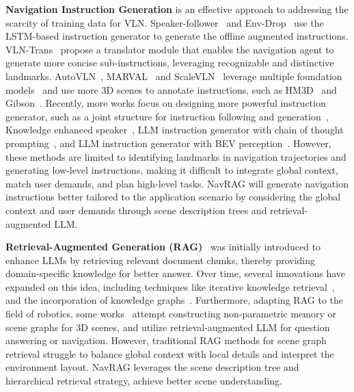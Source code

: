 \noindent \textbf{Navigation Instruction Generation} is an effective approach to addressing the scarcity of training data for VLN. Speaker-follower~\cite{fried2018speaker} and Env-Drop~\cite{tan2019learning} use the LSTM-based instruction generator to generate the offline augmented instructions. VLN-Trans~\cite{zhang2023vln} propose a translator module that enables the navigation agent to generate more concise sub-instructions, leveraging recognizable and distinctive landmarks. 
AutoVLN~\cite{chen2022learning}, MARVAL~\cite{kamath2023new} and ScaleVLN~\cite{wang2023scaling} leverage multiple foundation models~\cite{cheng2022masked,radford2019language,zhaolarge,koh2023simple} and use more 3D scenes to annotate instructions, such as HM3D~\cite{ramakrishnan2habitat} and Gibson~\cite{xia2018gibson}. Recently, more works focus on designing more powerful instruction generator, such as a joint structure for instruction following and generation~\cite{wang2023lana}, Knowledge enhanced speaker~\cite{zeng2023kefa}, LLM instruction generator with chain of thought prompting~\cite{kong2025controllable}, and LLM instruction generator with BEV perception~\cite{fan2025navigation}. However, these methods are limited to identifying landmarks in navigation trajectories and generating low-level instructions, making it difficult to integrate global context, match user demands, and plan high-level tasks. NavRAG will generate navigation instructions better tailored to the application scenario by considering the global context and user demands through scene description trees and retrieval-augmented LLM.

\noindent \textbf{Retrieval-Augmented Generation (RAG)}~\cite{lewis2020retrieval}  was initially introduced to enhance LLMs by retrieving relevant document chunks, thereby providing domain-specific knowledge for better answer. Over time, several innovations have expanded on this idea, including techniques like iterative knowledge retrieval~\cite{shao2023enhancing}, and the incorporation of knowledge graphs~\cite{edge2024local}. Furthermore, adapting RAG to the field of robotics, some works~\cite{xie2024embodied,booker2024embodiedrag} attempt constructing non-parametric memory or scene graphs for 3D scenes, and utilize retrieval-augmented LLM for question answering or navigation. However, traditional RAG methods for scene graph retrieval struggle to balance global context with local details and interpret the environment layout. NavRAG leverages the scene description tree and hierarchical retrieval strategy, achieve better scene understanding.